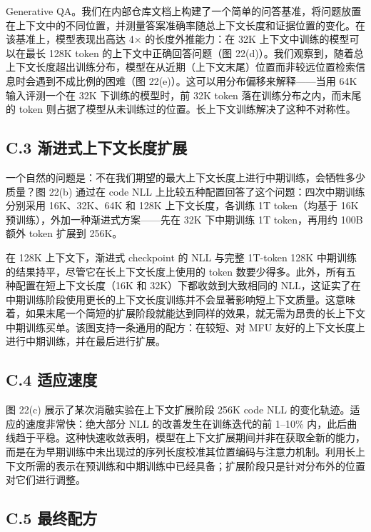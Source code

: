 Generative QA。我们在内部仓库文档上构建了一个简单的问答基准，将问题放置在上下文中的不同位置，并测量答案准确率随总上下文长度和证据位置的变化。在该基准上，模型表现出高达 4× 的长度外推能力：在 32K 上下文中训练的模型可以在最长 128K token 的上下文中正确回答问题（图 22(d)）。我们观察到，随着总上下文长度超出训练分布，模型在从近期（上下文末尾）位置而非较远位置检索信息时会遇到不成比例的困难（图 22(e)）。这可以用分布偏移来解释——当用 64K 输入评测一个在 32K 下训练的模型时，前 32K token 落在训练分布之内，而末尾的 token 则占据了模型从未训练过的位置。长上下文训练解决了这种不对称性。

\subsection{C.3 渐进式上下文长度扩展}\label{c.3-progressive-context-length-scaling}

一个自然的问题是：不在我们期望的最大上下文长度上进行中期训练，会牺牲多少质量？图 22(b) 通过在 code NLL 上比较五种配置回答了这个问题：四次中期训练分别采用 16K、32K、64K 和 128K 上下文长度，各训练 1T token（均基于 16K 预训练），外加一种渐进式方案——先在 32K 下中期训练 1T token，再用约 100B 额外 token 扩展到 256K。



在 128K 上下文下，渐进式 checkpoint 的 NLL 与完整 1T-token 128K 中期训练的结果持平，尽管它在长上下文长度上使用的 token 数要少得多。此外，所有五种配置在短上下文长度（16K 和 32K）下都收敛到大致相同的 NLL，这证实了在中期训练阶段使用更长的上下文长度训练并不会显著影响短上下文质量。这意味着，如果末尾一个简短的扩展阶段就能达到同样的效果，就无需为昂贵的长上下文中期训练买单。该图支持一条通用的配方：在较短、对 MFU 友好的上下文长度上进行中期训练，并在最后进行扩展。

\subsection{C.4 适应速度}\label{c.4-speed-of-adaptation}

图 22(c) 展示了某次消融实验在上下文扩展阶段 256K code NLL 的变化轨迹。适应的速度非常快：绝大部分 NLL 的改善发生在训练迭代的前 1--10\% 内，此后曲线趋于平稳。这种快速收敛表明，模型在上下文扩展期间并非在获取全新的能力，而是在为早期训练中未出现过的序列长度校准其位置编码与注意力机制。利用长上下文所需的表示在预训练和中期训练中已经具备；扩展阶段只是针对分布外的位置对它们进行调整。

\subsection{C.5 最终配方}\label{c.5-final-recipe}

